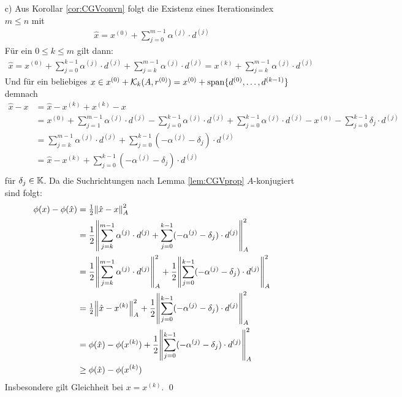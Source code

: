 \begin{enumerate}
  \item[c)] 
  Aus Korollar \ref{cor:CGVconvn} folgt die Existenz eines Iterationsindex $m\leq n$ mit 
  \begin{align*}
    \hat{x} 
    = x^{(0)} + \sum_{j=0}^{m-1} \alpha^{(j)}\cdot d^{(j)}
  \end{align*}
  Für ein $0\leq k\leq m$ gilt dann:
  \begin{align*}
    \hat{x}
    = x^{(0)} + \sum_{j=0}^{k-1} \alpha^{(j)}\cdot d^{(j)} + \sum_{j=k}^{m-1} \alpha^{(j)}\cdot d^{(j)} 
    = x^{(k)} + \sum_{j=k}^{m-1} \alpha^{(j)}\cdot d^{(j)}
  \end{align*}
  Und für ein beliebiges $x\in x^{(0)} + \mathcal{K}_k(A,r^{(0)}) = x^{(0)} + \operatorname*{span}\{d^{(0)},\dots,d^{(k-1)}\}$ 
  demnach
  \begin{align*}
    \hat{x}-x 
    & = \hat{x}-x^{(k)}+x^{(k)}-x \\
    & = x^{(0)} + \sum_{j=1}^{m-1}\alpha^{(j)}\cdot d^{(j)} 
    - \sum_{j=0}^{k-1} \alpha^{(j)}\cdot d^{(j)} 
    + \sum_{j=0}^{k-1} \alpha^{(j)}\cdot d^{(j)} 
    - x^{(0)} - \sum_{j=0}^{k-1}\delta_j\cdot d^{(j)}\\
    & = \sum_{j=k}^{m-1}\alpha^{(j)}\cdot d^{(j)} + \sum_{j=0}^{k-1}(-\alpha^{(j)}-\delta_j)\cdot d^{(j)} \\
    & = \hat{x} - x^{(k)} + \sum_{j=0}^{k-1}(-\alpha^{(j)}-\delta_j)\cdot d^{(j)} \\
  \end{align*}
  für $\delta_j\in\mathbb K$. Da die Suchrichtungen nach Lemma \ref{lem:CGVprop} $A$-konjugiert sind folgt:
  \begin{align*}
    \phi(x) - \phi(\hat{x})
    &= \tfrac{1}{2}\vertn{2}{\hat{x}-x}_A^2 \\
    &= \dfrac{1}{2}\vertn{2}{\sum_{j=k}^{m-1}\alpha^{(j)}\cdot d^{(j)} 
    + \sum_{j=0}^{k-1}(-\alpha^{(j)}-\delta_j)\cdot d^{(j)}}_A^2 \\
    &= \dfrac{1}{2}\vertn{2}{\sum_{j=k}^{m-1}\alpha^{(j)}\cdot d^{(j)}}_A^2 
    + \dfrac{1}{2}\vertn{2}{\sum_{j=0}^{k-1}(-\alpha^{(j)}-\delta_j)\cdot d^{(j)}}_A^2 \\
    &= \tfrac{1}{2}\vertn{2}{\hat{x}-x^{(k)}}_A^2 
    + \dfrac{1}{2}\vertn{2}{\sum_{j=0}^{k-1}(-\alpha^{(j)}-\delta_j)\cdot d^{(j)}}_A^2 \\
    &= \phi(\hat{x}) - \phi(x^{(k)}) + \dfrac{1}{2}\vertn{2}{\sum_{j=0}^{k-1}(-\alpha^{(j)}-\delta_j)\cdot d^{(j)}}_A^2 \\
    &\geq \phi(\hat{x}) - \phi(x^{(k)})
  \end{align*}
  Insbesondere gilt Gleichheit bei $x=x^{(k)}$.
  \qed
\end{enumerate}

